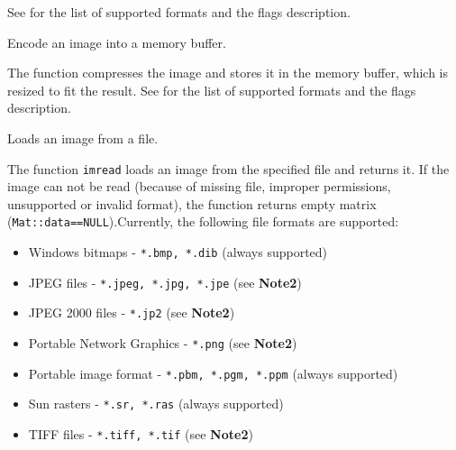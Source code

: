 See  for the list of supported formats and the flags description. 

Encode an image into a memory buffer.
\begin{description}
\end{description}

The function compresses the image and stores it in the memory buffer, which is resized to fit the result.
See  for the list of supported formats and the flags description.


Loads an image from a file.


\begin{description}
\begin{description}
\end{description}
\end{description}

The function \texttt{imread} loads an image from the specified file and returns it. If the image can not be read (because of missing file, improper permissions, unsupported or invalid format), the function returns empty matrix (\texttt{Mat::data==NULL}).Currently, the following file formats are supported:
\begin{itemize}
\item Windows bitmaps - \texttt{*.bmp, *.dib} (always supported)
\item JPEG files - \texttt{*.jpeg, *.jpg, *.jpe} (see \textbf{Note2})
\item JPEG 2000 files - \texttt{*.jp2} (see \textbf{Note2})
\item Portable Network Graphics - \texttt{*.png}  (see \textbf{Note2})
\item Portable image format - \texttt{*.pbm, *.pgm, *.ppm} (always supported)
\item Sun rasters - \texttt{*.sr, *.ras} (always supported)
\item TIFF files - \texttt{*.tiff, *.tif}  (see \textbf{Note2})
\end{itemize}

